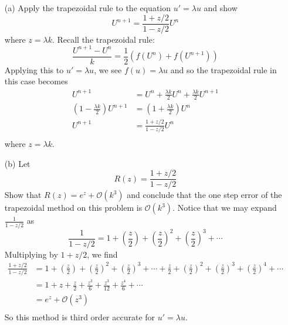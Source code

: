 \documentclass{article}
\begin{document}
\begin{enumerate}
    \item[(a)] Apply the trapezoidal rule to the equation $u' = \lambda u$ and show
    \[U^{n+1} = \frac{1 + z/2}{1 - z/2}U^n\]
    where $z = \lambda k$.
    \newline
    Recall the trapezoidal rule:
    \[\frac{U^{n+1} - U^n}{k} = \frac{1}{2}(f(U^n) + f(U^{n+1}))\]
    Applying this to $u' = \lambda u$, we see $f(u) = \lambda u$ and so the trapezoidal rule in this case becomes
    \begin{align*}
        U^{n+1} &= U^{n} + \frac{\lambda k}{2}U^n + \frac{\lambda k}{2} U^{n+1} \\
        \left(1 - \frac{\lambda k}{2}\right)U^{n+1} &= \left(1 + \frac{\lambda k}{2}\right)U^n \\
        U^{n+1} &= \frac{1 + z/2}{1 - z/2}U^n \\
    \end{align*}
    where $z = \lambda k$.
    
    \item[(b)] Let 
    \[R(z) = \frac{1 + z/2}{1 - z/2}\]
    Show that $R(z) = e^z + \mathcal{O}(k^3)$ and conclude that the one step error of the trapezoidal method on this problem is $\mathcal{O}(k^3)$.
    \newline
    Notice that we may expand $\frac{1}{1 - z/2}$ as 
    \[\frac{1}{1-z/2} = 1 + \left(\frac{z}{2}\right) + \left(\frac{z}{2}\right)^2 + \left(\frac{z}{2}\right)^3 + \cdots \]
    Multiplying by $1 + z/2$, we find
    \begin{align*}
        \frac{1+z/2}{1-z/2} &= 1 + \left(\frac{z}{2}\right) + \left(\frac{z}{2}\right)^2 + \left(\frac{z}{2}\right)^3 + \cdots + \frac{z}{2} + \left(\frac{z}{2}\right)^2 + \left(\frac{z}{2}\right)^3 + \left(\frac{z}{2}\right)^4 + \cdots \\
        &= 1 + z + \frac{z}{2} + \frac{z^3}{6} + \frac{z^3}{12} + \frac{z^4}{6} + \cdots \\
        &= e^z + \mathcal{O}(z^3) \\
    \end{align*}
    So this method is third order accurate for $u' = \lambda u$.
    
\end{enumerate}
\end{document}
